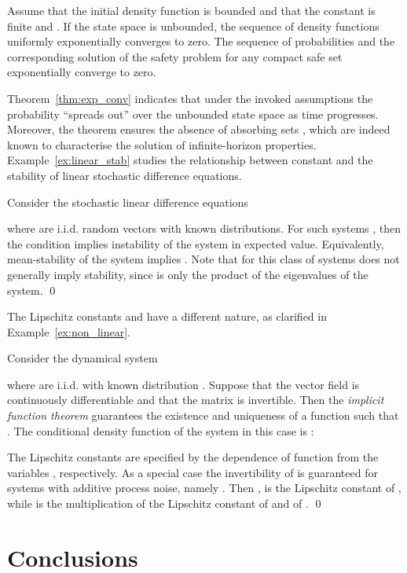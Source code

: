 \documentclass{LMCS}
\begin{document}
\begin{thm}
\label{thm:exp_conv}
Assume that the initial density function  is bounded and that
the constant  is finite and . 
If the state space is unbounded, the sequence of density functions  uniformly exponentially converges to zero. 
The sequence of probabilities  and the corresponding solution of the safety problem for any compact safe set  exponentially converge to zero. 
\end{thm}
Theorem~\ref{thm:exp_conv} indicates that under the invoked assumptions the probability ``spreads out'' over the unbounded state space as time progresses.  
Moreover, the theorem ensures the absence of absorbing sets \cite{ta2011,TA14}, 
which are indeed known to characterise the solution of infinite-horizon properties.
Example~\ref{ex:linear_stab} studies the relationship between constant  and the stability of linear stochastic difference equations.
\begin{exa}
\label{ex:linear_stab}
Consider the stochastic linear difference equations

where  are i.i.d. random vectors with known distributions.
For such systems , then the condition  implies instability of the system in expected value.
Equivalently, mean-stability of the system implies . 
Note that for this class of systems  does not generally imply stability, since  is only the product of the eigenvalues of the system. \hfill\qed
\end{exa}
The Lipschitz constants  and  have a different nature, as clarified in Example~\ref{ex:non_linear}. 
\begin{exa}
\label{ex:non_linear}
Consider the dynamical system 

where  are i.i.d. with known distribution . 
Suppose that the vector field  is continuously differentiable and that the matrix  is invertible. 
Then the \emph{implicit function theorem} guarantees the existence and uniqueness of a function  such that . 
The conditional density function of the system in this case is \cite{Papoulis91}:

The Lipschitz constants  are specified by the dependence of function  from the variables , respectively.
As a special case the invertibility of  is guaranteed for systems with additive process noise, namely
. Then ,
 is the Lipschitz constant of ,
while  is the multiplication of the Lipschitz constant of  and of . \hfill\qed
\end{exa}

\section{Conclusions} 
\label{sec:concl}
\end{document}
